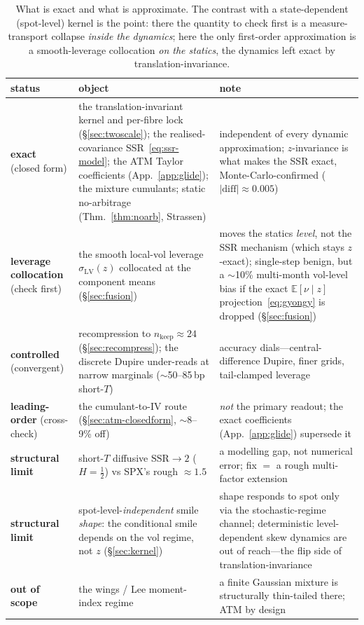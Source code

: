 \documentclass[11pt]{article}
\newcommand{\E}{\mathbb{E}}
\newcommand{\SSR}{\mathrm{SSR}}
\begin{document}
\begin{table}[h]
\centering\small
\setlength{\tabcolsep}{4pt}
\renewcommand{\arraystretch}{1.15}
\begin{tabular}{>{\raggedright\arraybackslash}p{}>{\raggedright\arraybackslash}p{}>{\raggedright\arraybackslash}p{}}
\toprule
status & object & note \\
\midrule
\textbf{exact} (closed form) & the translation-invariant kernel and per-fibre lock
(\S\ref{sec:twoscale}); the realised-covariance SSR~\eqref{eq:ssr-model}; the ATM Taylor
coefficients (App.~\ref{app:glide}); the mixture cumulants; static no-arbitrage
(Thm.~\ref{thm:noarb}, Strassen) & independent of every dynamic approximation; $z$-invariance
is what makes the SSR exact, Monte-Carlo-confirmed ($|\mathrm{diff}|\!\approx\!0.005$) \\
\textbf{leverage collocation} (check first) & the smooth local-vol leverage
$\sigma_{\mathrm{LV}}(z)$ collocated at the component means (\S\ref{sec:fusion}) & moves the
statics \emph{level}, not the SSR mechanism (which stays $z$-exact); single-step benign, but a
$\sim$10\% multi-month vol-level bias if the exact $\E[\nu\mid z]$ projection~\eqref{eq:gyongy} is
dropped (\S\ref{sec:fusion}) \\
\textbf{controlled} (convergent) & recompression to $n_{\mathrm{keep}}\!\approx\!24$
(\S\ref{sec:recompress}); the discrete Dupire under-reads at narrow marginals
($\sim$50--85\,bp short-$T$) & accuracy dials---central-difference Dupire, finer grids,
tail-clamped leverage \\
\textbf{leading-order} (cross-check) & the cumulant-to-IV route
(\S\ref{sec:atm-closedform}, $\sim$8--9\% off) & \emph{not} the primary readout; the exact
coefficients (App.~\ref{app:glide}) supersede it \\
\textbf{structural limit} & short-$T$ diffusive $\SSR\!\to\!2$ ($H{=}\tfrac12$) vs SPX's rough
$\approx\!1.5$ & a modelling gap, not numerical error; fix $=$ a rough multi-factor extension \\
\textbf{structural limit} & spot-level-\emph{independent} smile \emph{shape}: the conditional smile
depends on the vol regime, not $z$ (\S\ref{sec:kernel}) & shape responds to spot only via the
stochastic-regime channel; deterministic level-dependent skew dynamics are out of reach---the flip
side of translation-invariance \\
\textbf{out of scope} & the wings / Lee moment-index regime & a finite Gaussian mixture is
structurally thin-tailed there; ATM by design \\
\bottomrule
\end{tabular}
\caption{What is exact and what is approximate. The contrast with a state-dependent
(spot-level) kernel is the point: there the quantity to check first is a measure-transport
collapse \emph{inside the dynamics}; here the only first-order approximation is a
smooth-leverage collocation \emph{on the statics}, the dynamics left exact by
translation-invariance.}
\label{tab:ledger}
\end{table}
\end{document}
